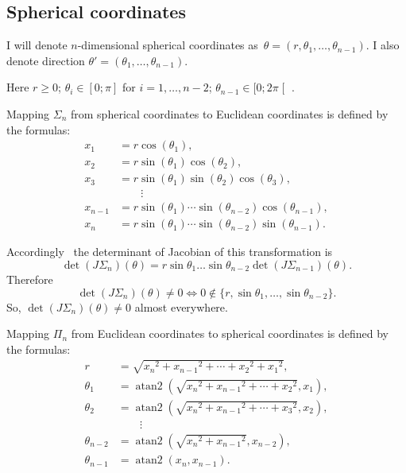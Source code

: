 \documentclass[oneside,draft]{amsart}
\begin{document}

\subsection{Spherical coordinates}

I will denote $n$-dimensional spherical coordinates as~$\theta=(r, \theta_1,\dots,\theta_{n-1})$.
I also denote direction $\theta'=(\theta_1,\dots,\theta_{n-1})$.

Here $r\geq 0$; $\theta_i\in[0;\pi]$ for $i=1,\dots,n-2$; $\theta_{n-1}\in[0;2\pi\mathclose[$ .

Mapping $\Sigma_n$ from spherical coordinates to Euclidean coordinates is defined by the formulas:
\[
\begin{aligned}x_{1}&=r\cos(\theta _{1}),\\x_{2}&=r\sin(\theta _{1})\cos(\theta _{2}),\\x_{3}&=r\sin(\theta _{1})\sin(\theta _{2})\cos(\theta _{3}),\\&\qquad \vdots \\x_{n-1}&=r\sin(\theta _{1})\cdots \sin(\theta _{n-2})\cos(\theta _{n-1}),\\x_{n}&=r\sin(\theta _{1})\cdots \sin(\theta _{n-2})\sin(\theta _{n-1}).\end{aligned}
\]

Accordingly~\cite{polar-jacobian} the determinant of Jacobian of this transformation is
\[ \det (J\Sigma_n)(\theta) = r\sin\theta_1\dots\sin\theta_{n-2}\det (J\Sigma_{n-1})(\theta). \]
Therefore
\[
\det (J\Sigma_n)(\theta)\ne 0\Leftrightarrow 0\notin\{r,\sin\theta_1,\dots,\sin\theta_{n-2}\}.
\]
So, $\det (J\Sigma_n)(\theta)\ne 0$ almost everywhere.

Mapping $\Pi_n$ from Euclidean coordinates to spherical coordinates is defined by the formulas:
\[
\begin{aligned}r&={\textstyle {\sqrt {{x_{n}}^{2}+{x_{n-1}}^{2}+\cdots +{x_{2}}^{2}+{x_{1}}^{2}}}},\\\theta _{1}&=\operatorname {atan2} \left({\textstyle {\sqrt {{x_{n}}^{2}+{x_{n-1}}^{2}+\cdots +{x_{2}}^{2}}}},x_{1}\right),\\\theta _{2}&=\operatorname {atan2} \left({\textstyle {\sqrt {{x_{n}}^{2}+{x_{n-1}}^{2}+\cdots +{x_{3}}^{2}}}},x_{2}\right),\\&\qquad \vdots \\\theta _{n-2}&=\operatorname {atan2} \left({\textstyle {\sqrt {{x_{n}}^{2}+{x_{n-1}}^{2}}}},x_{n-2}\right),\\\theta _{n-1}&=\operatorname {atan2} \left(x_{n},x_{n-1}\right).\end{aligned}
\]  
\end{document}
